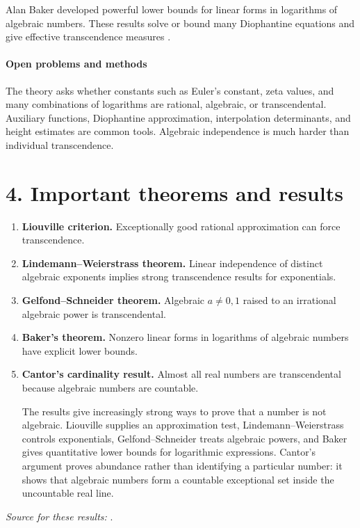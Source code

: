 Alan Baker developed powerful lower bounds for linear forms in logarithms of algebraic numbers. These results solve or bound many Diophantine equations and give effective transcendence measures \cite{trans_ref4}.

\paragraph{Open problems and methods}
The theory asks whether constants such as Euler's constant, zeta values, and many combinations of logarithms are rational, algebraic, or transcendental. Auxiliary functions, Diophantine approximation, interpolation determinants, and height estimates are common tools. Algebraic independence is much harder than individual transcendence.

\section*{4. Important theorems and results}
\begin{enumerate}[leftmargin=*,itemsep=0.35em]
\item \textbf{Liouville criterion.} Exceptionally good rational approximation can force transcendence.

\item \textbf{Lindemann--Weierstrass theorem.} Linear independence of distinct algebraic exponents implies strong transcendence results for exponentials.

\item \textbf{Gelfond--Schneider theorem.} Algebraic $a\ne0,1$ raised to an irrational algebraic power is transcendental.

\item \textbf{Baker's theorem.} Nonzero linear forms in logarithms of algebraic numbers have explicit lower bounds.

\item \textbf{Cantor's cardinality result.} Almost all real numbers are transcendental because algebraic numbers are countable.

The results give increasingly strong ways to prove that a number is not algebraic. Liouville supplies an approximation test, Lindemann--Weierstrass controls exponentials, Gelfond--Schneider treats algebraic powers, and Baker gives quantitative lower bounds for logarithmic expressions. Cantor's argument proves abundance rather than identifying a particular number: it shows that algebraic numbers form a countable exceptional set inside the uncountable real line.
\end{enumerate}
\noindent\emph{Source for these results:} \cite{trans_ref1}.

